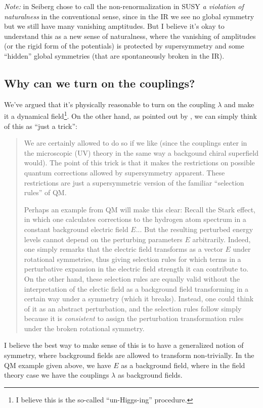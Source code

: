 \documentclass[a4paper
	,10pt
]{article}
\begin{document}
	\textit{Note:} in \cite{Seiberg:1993vc} Seiberg chose to call the non-renormalization in SUSY \textit{a violation of naturalness} in the conventional sense, since in the IR we see no global symmetry but we still have many vanishing amptitudes. But I believe it's okay to understand this as a new sense of naturalness, where the vanishing of amplitudes (or the rigid form of the potentials) is protected by supersymmetry and some ``hidden'' global symmetries (that are spontaneously broken in the IR). 
	
\subsection{Why can we turn on the couplings?}
	We've argued that it's physically reasonable to turn on the coupling $\lambda$ and make it a dynamical field\footnote{
		I believe this is the so-called ``un-Higgs-ing'' procedure.
	}. On the other hand, as pointed out by \textcite{Argyres:1996abc}, we can simply think of this as ``just a trick'':
	
	\begin{quote}
	We are certainly allowed to do so if we like (since the couplings enter in the microscopic (UV) theory in the same way a backgound chiral superfield would). The point of this trick is that it makes the restrictions on possible quantum corrections allowed by supersymmetry apparent. These restrictions are just a supersymmetric version of the familiar “selection rules” of QM.
		
	Perhaps an example from QM will make this clear: Recall the Stark effect, in which one calculates corrections to the hydrogen atom spectrum in a constant background electric field $E$... But the resulting perturbed energy levels cannot depend on the perturbing parameters $E$ arbitrarily. Indeed, one simply remarks that the electric field transforms as a vector $E$ under rotational symmetries, thus giving selection rules for which terms in a perturbative expansion in the electric field strength it can contribute to. On the other hand, these selection rules are equally valid without the interpretation of the electic field as a background field transforming in a certain way under a symmetry (which it breaks). Instead, one could think of it as an abstract perturbation, and the selection rules follow simply because it is \textit{consistent} to assign the perturbation transformation rules under the broken rotational symmetry.
	\end{quote}
	
	I believe the best way to make sense of this is to have a generalized notion of symmetry, where background fields are allowed to transform non-trivially. In the QM example given above, we have $E$ as a background field, where in the field theory case we have the couplings $\lambda$ as background fields. 
	
\end{document}
